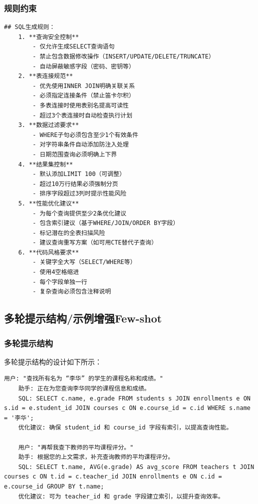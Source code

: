 \documentclass{article}
\begin{document}
	\subsubsection{规则约束}
	
	\begin{lstlisting}[title=规则约束, tabsize=4]
	## SQL生成规则：
	1. **查询安全控制**
		- 仅允许生成SELECT查询语句
		- 禁止包含数据修改操作（INSERT/UPDATE/DELETE/TRUNCATE）
		- 自动屏蔽敏感字段（密码、密钥等）
	2. **表连接规范**
		- 优先使用INNER JOIN明确关联关系
		- 必须指定连接条件（禁止笛卡尔积）
		- 多表连接时使用表别名提高可读性
		- 超过3个表连接时自动检查执行计划
	3. **数据过滤要求**
		- WHERE子句必须包含至少1个有效条件
		- 对字符串条件自动添加防注入处理
		- 日期范围查询必须明确上下界
	4. **结果集控制**
		- 默认添加LIMIT 100（可调整）
		- 超过10万行结果必须强制分页
		- 排序字段超过3列时提示性能风险
	5. **性能优化建议**
		- 为每个查询提供至少2条优化建议
		- 包含索引建议（基于WHERE/JOIN/ORDER BY字段）
		- 标记潜在的全表扫描风险
		- 建议查询重写方案（如可用CTE替代子查询）
	6. **代码风格要求**
		- 关键字全大写（SELECT/WHERE等）
		- 使用4空格缩进
		- 每个字段单独一行
		- 复杂查询必须包含注释说明
	\end{lstlisting}
	
	\subsection{多轮提示结构/示例增强Few-shot}
	
	\subsubsection{多轮提示结构}
	
	多轮提示结构的设计如下所示：
	
	\begin{lstlisting}[title=多轮提示结构, tabsize=4]
	用户: "查找所有名为 “李华” 的学生的课程名称和成绩。"
	助手: 正在为您查询李华同学的课程信息和成绩。
	SQL: SELECT c.name, e.grade FROM students s JOIN enrollments e ON s.id = e.student_id JOIN courses c ON e.course_id = c.id WHERE s.name = '李华';
	优化建议: 确保 student_id 和 course_id 字段有索引，以提高查询性能。
	
	用户: "再帮我查下教师的平均课程评分。"
	助手: 根据您的上文需求，补充查询教师的平均课程评分。
	SQL: SELECT t.name, AVG(e.grade) AS avg_score FROM teachers t JOIN courses c ON t.id = c.teacher_id JOIN enrollments e ON c.id = e.course_id GROUP BY t.name;
	优化建议: 可为 teacher_id 和 grade 字段建立索引，以提升查询效率。
	\end{lstlisting}
	
\end{document}
